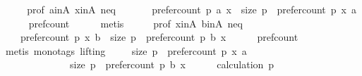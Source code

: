 \begin{isabellebody}
%
\isadelimproof
%
\endisadelimproof
%
\isatagproof
{}\isamarkupfalse%
\ {\isacharminus}{\kern0pt}\isanewline
\ \ \isamarkupfalse%
\ prof\ a{\isacharunderscore}{\kern0pt}in{\isacharunderscore}{\kern0pt}A\ x{\isacharunderscore}{\kern0pt}in{\isacharunderscore}{\kern0pt}A\ neq{}\ \isamarkupfalse%
\ {}{\isacharcolon}{\kern0pt}\isanewline
\ \ \ \ {\isachardoublequoteopen}prefer{\isacharunderscore}{\kern0pt}count\ p\ a\ x\ {\isacharequal}{\kern0pt}\ {\isacharparenleft}{\kern0pt}size\ p{\isacharparenright}{\kern0pt}\ {\isacharminus}{\kern0pt}\ {\isacharparenleft}{\kern0pt}prefer{\isacharunderscore}{\kern0pt}count\ p\ x\ a{\isacharparenright}{\kern0pt}{\isachardoublequoteclose}\isanewline
\ \ \ \ \isamarkupfalse%
\ pref{\isacharunderscore}{\kern0pt}count\isanewline
\ \ \ \ \isamarkupfalse%
\ metis\isanewline
\ \ \isamarkupfalse%
\ \isamarkupfalse%
\ prof\ x{\isacharunderscore}{\kern0pt}in{\isacharunderscore}{\kern0pt}A\ b{\isacharunderscore}{\kern0pt}in{\isacharunderscore}{\kern0pt}A\ neq{}\ \isamarkupfalse%
\ {}{\isacharcolon}{\kern0pt}\isanewline
\ \ \ \ {\isachardoublequoteopen}prefer{\isacharunderscore}{\kern0pt}count\ p\ x\ b\ {\isacharequal}{\kern0pt}\ {\isacharparenleft}{\kern0pt}size\ p{\isacharparenright}{\kern0pt}\ {\isacharminus}{\kern0pt}\ {\isacharparenleft}{\kern0pt}prefer{\isacharunderscore}{\kern0pt}count\ p\ b\ x{\isacharparenright}{\kern0pt}{\isachardoublequoteclose}\isanewline
\ \ \ \ \isamarkupfalse%
\ pref{\isacharunderscore}{\kern0pt}count\isanewline
\ \ \ \ \isamarkupfalse%
\ {\isacharparenleft}{\kern0pt}metis\ {\isacharparenleft}{\kern0pt}mono{\isacharunderscore}{\kern0pt}tags{\isacharcomma}{\kern0pt}\ lifting{\isacharparenright}{\kern0pt}{\isacharparenright}{\kern0pt}\isanewline
\ \ \isamarkupfalse%
\ {}{\isacharcolon}{\kern0pt}\ {\isachardoublequoteopen}{\isacharparenleft}{\kern0pt}size\ p{\isacharparenright}{\kern0pt}\ {\isacharminus}{\kern0pt}\ {\isacharparenleft}{\kern0pt}prefer{\isacharunderscore}{\kern0pt}count\ p\ x\ a{\isacharparenright}{\kern0pt}\ {\isasymge}\isanewline
\ \ \ \ \ \ \ \ \ \ \ \ \ \ {\isacharparenleft}{\kern0pt}size\ p{\isacharparenright}{\kern0pt}\ {\isacharminus}{\kern0pt}\ {\isacharparenleft}{\kern0pt}prefer{\isacharunderscore}{\kern0pt}count\ p\ b\ x{\isacharparenright}{\kern0pt}{\isachardoublequoteclose}\isanewline
\ \ \ \ \isamarkupfalse%
\ calculation\ p{}\isanewline

\end{isabellebody}
